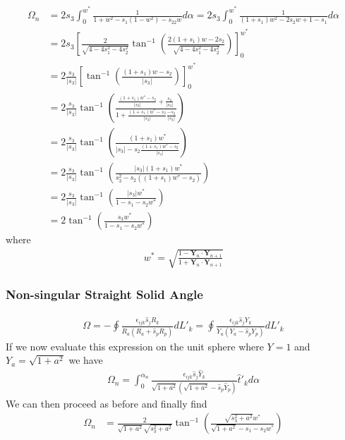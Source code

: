 \begin{align}
\Omega_n
&=2s_3\int_0^{w^*}\frac{1}{1+w^2-s_1(1-w^2)-s_22w}d\alpha
=2s_3\int_0^{w^*}\frac{1}{(1+s_1)w^2-2s_2w+1-s_1}d\alpha\nonumber\\
&=2s_3\left[\frac{2}{\sqrt{4-4s_1^2-4s_2^2}}\tan^{-1}\left(\frac{2(1+s_1)w-2s_2}{\sqrt{4-4s_1^2-4s_2^2}}\right)\right]_0^{w^*}\nonumber\\
&=2\frac{s_3}{|s_3|}\left[\tan^{-1}\left(\frac{(1+s_1)w-s_2}{|s_3|}\right)\right]_0^{w^*}\nonumber\\
&=2\frac{s_3}{|s_3|}\tan^{-1}\left(\frac{\frac{(1+s_1)w^*-s_2}{|s_3|}+\frac{s_2}{|s_3|}}{1+\frac{(1+s_1)w^*-s_2}{|s_3|}\frac{-s_2}{|s_3|}}\right)\nonumber\\
&=2\frac{s_3}{|s_3|}\tan^{-1}\left(\frac{(1+s_1)w^*}{|s_3|-s_2\frac{(1+s_1)w^*-s_2}{|s_3|}}\right)\nonumber\\
&=2\frac{s_3}{|s_3|}\tan^{-1}\left(\frac{|s_3|(1+s_1)w^*}{s_3^2-s_2((1+s_1)w^*-s_2)}\right)\nonumber\\
&=2\frac{s_3}{|s_3|}\tan^{-1}\left(\frac{|s_3|w^*}{1-s_1-s_2w^*}\right)\nonumber\\
&=2\tan^{-1}\left(\frac{s_3w^*}{1-s_1-s_2w^*}\right)
\end{align}
where
\begin{align}
w^*=\sqrt{\frac{1-\bm Y_n\cdot \bm Y_{n+1}}{1+\bm Y_n\cdot \bm Y_{n+1}}}
\end{align}

\subsubsection{Non-singular Straight Solid Angle}
\begin{align}
\Omega=-\oint\frac{\epsilon_{ijk}\hat{s}_jR_k}{R_a(R_a+\hat{s}_pR_p)}dL'_k=\oint\frac{\epsilon_{ijk}\hat{s}_jY_k}{Y_a(Y_a-\hat{s}_pY_p)}dL'_k
\end{align}
If we now evaluate this expression on the unit sphere where $Y=1$ and $Y_a=\sqrt{1+a^2}$ we have
\begin{align}
\Omega_n=\int_0^{\alpha_n}\frac{\epsilon_{ijk}\hat{s}_j\hat{Y}_k}{\sqrt{1+a^2}(\sqrt{1+a^2}-\hat{s}_p\hat{Y}_p)}\hat{t}'_kd\alpha
\end{align}
We can then proceed as before and finally find
\begin{align}
\Omega_n
&=\frac{2}{\sqrt{1+a^2}\sqrt{s_3^2+a^2}}\tan^{-1}\left(\frac{\sqrt{s_3^2+a^2}w^*}{\sqrt{1+a^2}-s_1-s_2w^*}\right)
\end{align}